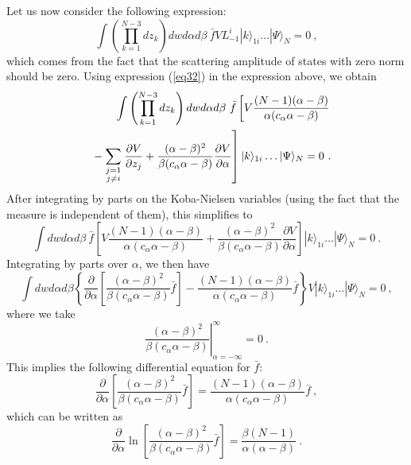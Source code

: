 \documentclass[a4paper,12pt]{article}
\begin{document}
Let us now consider the following expression:
\begin{equation}
\int \left( \prod_{k=1}^{N-3}dz_k\right) dwd\alpha d\beta \ \bar fVL_{-1}^i|k\rangle _{1i}\dots |\Psi \rangle _N=0\ ,
\end{equation}
which comes from the fact that the scattering amplitude of states with zero norm should be zero. Using expression (\ref{eq32}) in the expression above, we obtain
\begin{eqnarray}
 & & \int \left( \prod_{k=1}^{N-3}dz_k\right) dwd\alpha d\beta \ \bar f\left[ V\frac{(N-1)(\alpha -\beta )}{\alpha (c_\alpha \alpha -\beta )}\right. \nonumber \\ 
 & & \left. -\sum_{\scriptstyle j=1\atop \scriptstyle j\neq i}\frac{\partial V}{\partial z_j} +\frac{(\alpha -\beta )^2}{\beta (c_\alpha \alpha -\beta )}\frac{\partial V}{\partial \alpha }\right] |k\rangle _{1i}\dots |\Psi \rangle _N=0\ .
\end{eqnarray}
After integrating by parts on the Koba-Nielsen variables (using the fact that the measure is independent of them), this simplifies to
\begin{equation}
\int dwd\alpha d\beta \ \bar f\left[ V\frac{(N-1)(\alpha -\beta )}{\alpha (c_\alpha \alpha -\beta )}+\frac{(\alpha -\beta )^2}{\beta (c_\alpha \alpha -\beta )}\frac{\partial V}{\partial \alpha }\right] |k\rangle _{1i}\dots |\Psi \rangle _N=0\ .
\end{equation}
Integrating by parts over $\alpha $, we then have
\begin{equation}
\int dwd\alpha d\beta \left\{ \frac{\partial }{\partial \alpha }\left[ \frac{(\alpha -\beta )^2}{\beta (c_\alpha \alpha -\beta )}\bar f\right] -\frac{(N-1)(\alpha -\beta )}{\alpha (c_\alpha \alpha -\beta )}\bar f\right\} V|k\rangle _{1i}\dots |\Psi \rangle _N=0\ ,
\end{equation}
where we take
\begin{equation}
\label{eq37}
\left. \frac{(\alpha -\beta )^2}{\beta (c_\alpha \alpha -\beta )}\right| _{\alpha =-\infty }^\infty =0\ .
\end{equation}
This implies the following differential equation for $\bar f$:
\begin{equation}
\frac{\partial }{\partial \alpha }\left[ \frac{(\alpha -\beta )^2}{\beta (c_\alpha \alpha -\beta )}\bar f\right] =\frac{(N-1)(\alpha -\beta )}{\alpha (c_\alpha \alpha -\beta )}\bar f\ ,
\end{equation}
which can be written as
\begin{equation}
\frac{\partial }{\partial \alpha }\ln \left[ \frac{(\alpha -\beta )^2}{\beta (c_\alpha \alpha -\beta )}\bar f\right] =\frac{\beta (N-1)}{\alpha (\alpha -\beta )}\ .
\end{equation}
\end{document}

